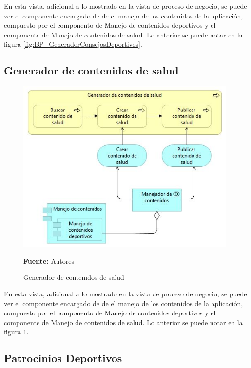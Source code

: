 En esta vista, adicional a lo mostrado en la vista de proceso de negocio, se puede ver el componente encargado de de el manejo de los contenidos de la aplicación, compuesto por el componento de Manejo de contenidos deportivos y el componente de Manejo de contenidos de salud. Lo anterior se puede notar en la figura \ref{fig:BP_GeneradorConsejosDeportivos}.

\subsection{Generador de contenidos de salud}

\begin{figure}[!htb]
  \begin{center}
    \includegraphics[width=11cm]{./imagenes/Archimate/vistas/application_usage/generadorcontenidossalud.png}
    \caption{Generador de contenidos de salud}
    \label{fig:BP_GeneradorContenidosSalud}
    \textbf{Fuente:}  Autores \\
  \end{center}
\end{figure}

En esta vista, adicional a lo mostrado en la vista de proceso de negocio, se puede ver el componente encargado de de el manejo de los contenidos de la aplicación, compuesto por el componento de Manejo de contenidos deportivos y el componente de Manejo de contenidos de salud. Lo anterior se puede notar en la figura \ref{fig:BP_GeneradorContenidosSalud}.

\subsection{Patrocinios Deportivos}

